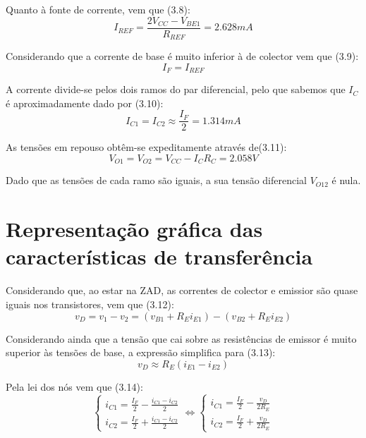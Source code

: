 \documentclass[a4paper,2pt]{report}
\begin{document}
\par Quanto à fonte de corrente, vem que (3.8):
\begin{equation}
    I_{REF} = \frac{2V_{CC}-V_{BE1}}{R_{REF}} = 2.628\textit{mA}
\end{equation}

\par Considerando que a corrente de base é muito inferior à de colector vem que (3.9):
\begin{equation}
    I_F = I_{REF}
\end{equation}

\par A corrente divide-se pelos dois ramos do par diferencial, pelo que sabemos que \(I_C\) é aproximadamente dado por (3.10):
\begin{equation}
    I_{C1} = I_{C2} \approx \frac{I_{F}}{2} = 1.314\textit{mA}
\end{equation}

\par As tensões em repouso obtêm-se expeditamente através de(3.11):
\begin{equation}
    V_{O1} = V_{O2} = V_{CC} - I_C R_C = 2.058V
\end{equation}

\par Dado que as tensões de cada ramo são iguais, a sua tensão diferencial \(V_{O12}\) é nula.

\section{Representação gráfica das características de transferência}

\par Considerando que, ao estar na ZAD, as correntes de colector e emissior são quase iguais nos transistores, vem que (3.12):
\begin{equation}
    v_D = v_1 - v_2 = (v_{B1} + R_E i_{E1}) - (v_{B2} + R_E i_{E2})
\end{equation}

\par Considerando ainda que a tensão que cai sobre as resistências de emissor é muito superior às tensões de base, a expressão simplifica para (3.13):
\begin{equation}
    v_D \approx R_E(i_{E1} - i_{E2})
\end{equation}

\par Pela lei dos nós vem que (3.14):
\begin{equation}
    \begin{cases}
        i_{C1} = \frac{I_F}{2} - \frac{i_{C1} - i_{C2}}{2} \\
        i_{C2} = \frac{I_F}{2} + \frac{i_{C1} - i_{C2}}{2} 
    \end{cases}
    \Leftrightarrow
    \begin{cases}
        i_{C1} = \frac{I_F}{2} - \frac{v_D}{2R_E} \\
        i_{C2} = \frac{I_F}{2} + \frac{v_D}{2R_E}
    \end{cases}
\end{equation}
\end{document}
